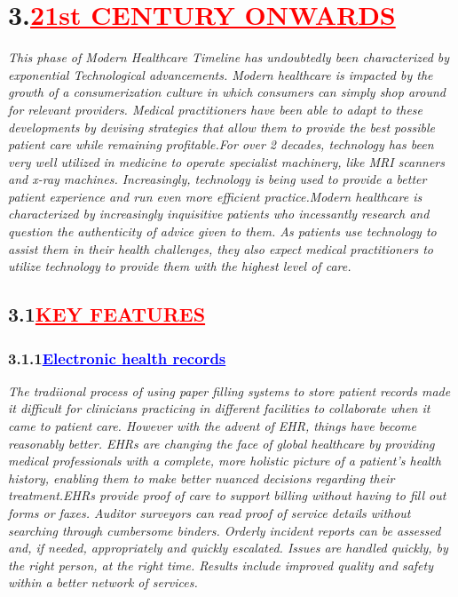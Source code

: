 \documentclass[12pt]{article}
\begin{document}
\section*{\textbf{3.\hspace{1cm}\textcolor{red}{\underline{\huge{21st CENTURY ONWARDS}}}}}
\hspace{1cm}\large{\emph{This phase of Modern Healthcare Timeline has undoubtedly been characterized by exponential Technological advancements. Modern healthcare is impacted by the growth of a consumerization culture in which consumers can simply shop around for relevant providers. Medical practitioners have been able to adapt to these developments by devising strategies that allow them to provide the best possible patient care while remaining profitable.\vspace{0.5cm}\newline For over 2 decades, technology has been very well utilized in medicine to operate specialist machinery, like MRI scanners and x-ray machines. Increasingly, technology is being used to provide a better patient experience and run even more efficient practice.\vspace{0.5cm}\newline Modern healthcare is characterized by increasingly inquisitive patients who incessantly research and question the authenticity of advice given to them. As patients use technology to assist them in their health challenges, they also expect medical practitioners to utilize technology to provide them with the highest level of care.}}
\subsection*{\textbf{\hspace{1cm}3.1\hspace{1cm}\textcolor{red}{\underline{\LARGE{KEY FEATURES}}}}}
\subsubsection*{\textbf{\hspace{2cm}3.1.1\hspace{1cm}\textcolor{blue}{\underline{\Large{Electronic health records}}}}}
\hspace{3cm}\large{\emph{The tradiional process of using paper filling systems to store patient records made it difficult for clinicians practicing in different facilities to collaborate when it came to patient care. However with the advent of EHR, things have become reasonably better. EHRs are changing the face of global healthcare by providing medical professionals with a complete, more holistic picture of a patient’s health history, enabling them to make better nuanced decisions regarding their treatment.\newline EHRs provide proof of care to support billing without having to fill out forms or faxes. Auditor surveyors can read proof of service details without searching through cumbersome binders. Orderly incident reports can be assessed and, if needed, appropriately and quickly escalated. Issues are handled quickly, by the right person, at the right time. Results include improved quality and safety within a better network of services.}}
\end{document}
